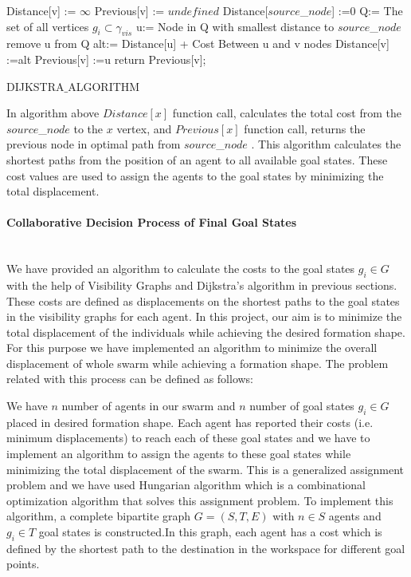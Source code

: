 \begin{algorithm}[H]
{		
Distance[v] := $\infty$ \;
Previous[v] := $undefined$ \;
}
Distance[$source$\_$ node$] :=0  \;
Q:= The set of all vertices $g_i \subset \gamma_{vis}$ \;
{
u:= Node in Q with smallest distance to $source$\_$ node$\;
remove u from Q\;
{
alt:= Distance[u] + Cost Between u and v nodes\;
{
Distance[v] :=alt\;
Previous[v] :=u\;
}
}
}
return Previous[v]; \newline
\caption{DIJKSTRA$\_$ALGORITHM}
\end{algorithm}

In algorithm above $Distance[x]$ function call, calculates the total cost from the $source$\_$ node$ to the $x$ vertex, and $Previous[x]$ function call, returns the previous node in optimal path from $source$\_$ node$ . This algorithm calculates the shortest paths from the position of an agent to all available goal states. These cost values are used to assign the agents to the goal states by minimizing the total displacement.  

\paragraph{Collaborative Decision Process of Final Goal States}\hspace{0pt} \\
We have provided an algorithm to calculate the costs to the goal states $g_i \in G$ with the help of Visibility Graphs and Dijkstra's algorithm in previous sections. These costs are defined as displacements on the shortest paths to the goal states in the visibility graphs for each agent. In this project, our aim is to minimize the total displacement of the individuals while achieving the desired formation shape. For this purpose we have implemented an algorithm to minimize the overall displacement of whole swarm while achieving a formation shape. The problem related with this process can be defined as follows:

We have $n$ number of agents in our swarm and $n$ number of goal states $g_i \in G$ placed in desired formation shape. Each agent has reported their costs (i.e. minimum displacements) to reach each of these goal states and we have to implement an algorithm to assign the agents to these goal states while minimizing the total displacement of the swarm. This is a generalized assignment problem and we have used Hungarian algorithm which is a combinational optimization algorithm that solves this assignment problem. To implement this algorithm, a complete bipartite graph $G=(S,T,E)$ with $n \in S$ agents and $g_i \in T$ goal states is constructed.In this graph, each agent has a cost which is defined by the shortest path to the destination in the workspace for different goal points. 

